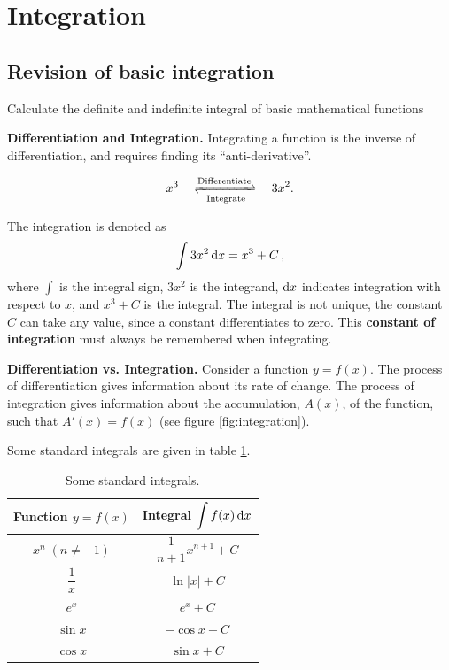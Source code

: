 \setcounter{section}{2}
\section{Integration}

\begin{ILOssec}
    \item \ILOd
\end{ILOssec}

\subsection{Revision of basic integration}
\label{sec:basic_int}

\begin{learningoutcomes}
\item Calculate the definite and indefinite integral of basic mathematical functions
\end{learningoutcomes}

\textbf{Differentiation and Integration.} Integrating a function is the inverse of differentiation, and requires finding its ``anti-derivative''.

\[
x^3 \quad \xrightleftharpoons[\text{Integrate}]{\text{Differentiate}} \quad 3x^2.
\]

The integration is denoted as
\[
\int 3x^2\,{\rm d}x=x^3+C \, ,
\]
where $\int$ is the integral sign, $3x^2$ is the integrand, ${\rm d}x$ indicates integration with respect to $x$, and $x^3+C$ is the integral. The integral is not unique, the constant $C$ can take any value, since a constant differentiates to zero. This \textbf{constant of integration} must always be remembered when integrating.

\textbf{Differentiation vs. Integration.} Consider a function $y=f(x)$.
The process of differentiation gives information about its rate of change.
The process of integration gives information about the accumulation, $A(x)$, of the function, such that $A'(x) = f(x)$ (see figure \ref{fig:integration}).

Some standard integrals are given in table \ref{tab:standard_int}.

{\renewcommand{\arraystretch}{1.75}
\begin{table}[ht]
\centering
\begin{tabular}{|c|c|} \hline
    \textbf{Function }$y=f(x)$ & \textbf{Integral }$\displaystyle\int f(x)\,{\rm d}x$\\ \hline
    $x^n \; (n\neq-1)$& $\dfrac{1}{n+1}x^{n+1}+C$\\
    $\dfrac{1}{x}$ & $\ln |x|+C$\\
    $e^x$ & $e^x+C$\\
    $\sin x$ & $-\cos x+C$\\
    $\cos x$ & $\sin x+C$\\\hline
\end{tabular}
\caption{Some standard integrals.}
\label{tab:standard_int}
\end{table}}

